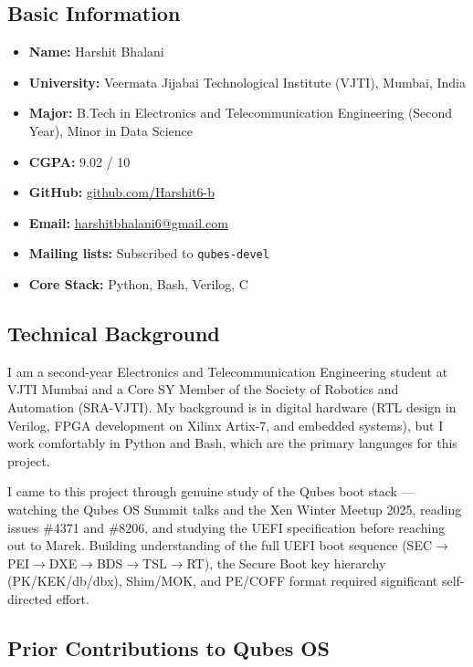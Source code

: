 \documentclass[12pt, a4paper]{article}
\begin{document}
\subsection*{Basic Information}
\begin{itemize}
    \item \textbf{Name:} Harshit Bhalani
    \item \textbf{University:} Veermata Jijabai Technological Institute (VJTI), Mumbai, India
    \item \textbf{Major:} B.Tech in Electronics and Telecommunication Engineering (Second Year), Minor in Data Science
    \item \textbf{CGPA:} 9.02 / 10
    \item \textbf{GitHub:} \href{https://github.com/Harshit6-b}{github.com/Harshit6-b}
    \item \textbf{Email:} \href{mailto:harshitbhalani6@gmail.com}{harshitbhalani6@gmail.com}
    \item \textbf{Mailing lists:} Subscribed to \texttt{qubes-devel}
    \item \textbf{Core Stack:} Python, Bash, Verilog, C
\end{itemize}

\subsection*{Technical Background}

I am a second-year Electronics and Telecommunication Engineering student at VJTI Mumbai and a Core SY Member of the Society of Robotics and Automation (SRA-VJTI). My background is in digital hardware (RTL design in Verilog, FPGA development on Xilinx Artix-7, and embedded systems), but I work comfortably in Python and Bash, which are the primary languages for this project.

I came to this project through genuine study of the Qubes boot stack --- watching the Qubes OS Summit talks and the Xen Winter Meetup 2025, reading issues \#4371 and \#8206, and studying the UEFI specification before reaching out to Marek. Building understanding of the full UEFI boot sequence (SEC$\to$PEI$\to$DXE$\to$BDS$\to$TSL$\to$RT), the Secure Boot key hierarchy (PK/KEK/db/dbx), Shim/MOK, and PE/COFF format required significant self-directed effort.

\subsection*{Prior Contributions to Qubes OS}
\end{document}
